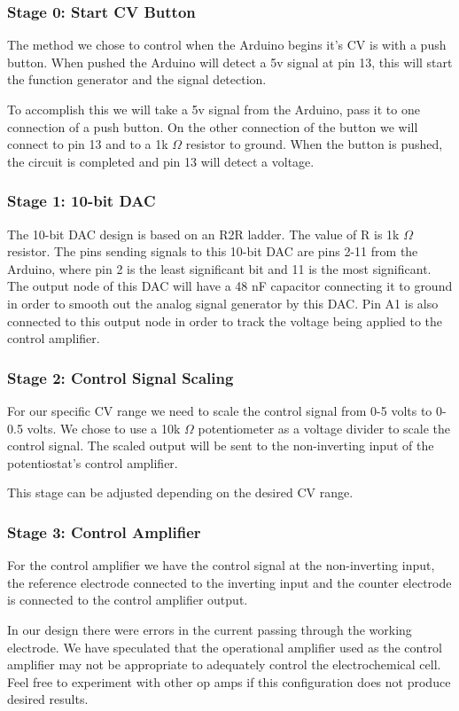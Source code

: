 \documentclass{article}
\begin{document}
\subsubsection*{Stage 0: Start CV Button}
The method we chose to control when the Arduino begins it's CV is with a push button. When pushed the Arduino will detect a 5v signal at pin 13, this will start the function generator and the signal detection.

To accomplish this we will take a 5v signal from the Arduino, pass it to one connection of a push button. On the other connection of the button we will connect to pin 13 and to a 1k $\Omega$ resistor to ground. When the button is pushed, the circuit is completed and pin 13 will detect a voltage.
\subsubsection*{Stage 1: 10-bit DAC}
The 10-bit DAC design is based on an R2R ladder. The value of R is 1k $\Omega$ resistor. The pins sending signals to this 10-bit DAC are pins 2-11 from the Arduino, where pin 2 is the least significant bit and 11 is the most significant. The output node of this DAC will have a 48 nF capacitor connecting it to ground in order to smooth out the analog signal generator by this DAC. Pin A1 is also connected to this output node in order to track the voltage being applied to the control amplifier.
\subsubsection*{Stage 2: Control Signal Scaling}
For our specific CV range we need to scale the control signal from 0-5 volts to 0-0.5 volts. We chose to use a 10k $\Omega$ potentiometer as a voltage divider to scale the control signal. The scaled output will be sent to the non-inverting input of the potentiostat's control amplifier. 

This stage can be adjusted depending on the desired CV range.

\subsubsection*{Stage 3: Control Amplifier}
For the control amplifier we have the control signal at the non-inverting input, the reference electrode connected to the inverting input and the counter electrode is connected to the control amplifier output.

In our design there were errors in the current passing through the working electrode. We have speculated that the operational amplifier used as the control amplifier may not be appropriate to adequately control the electrochemical cell. Feel free to experiment with other op amps if this configuration does not produce desired results.
\end{document}
